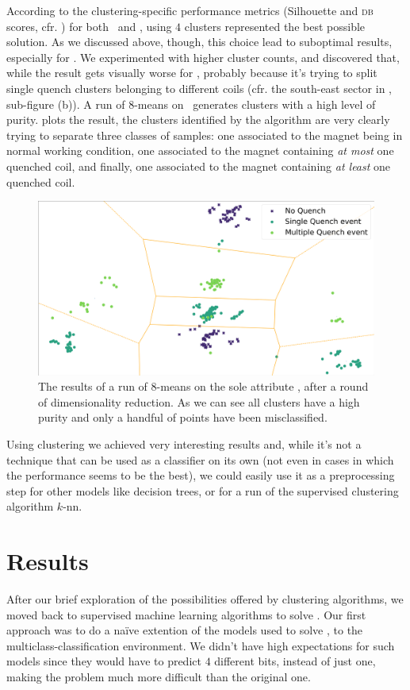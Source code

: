 According to the clustering-specific performance metrics (Silhouette and \textsc{db} scores, cfr.
) for both \an\ and \cnmod, using $4$ clusters represented the best possible solution.
As we discussed above, though, this choice lead to suboptimal results, especially for \an.  We
experimented with higher cluster counts, and discovered that, while the result gets visually worse
for \cnmod, probably because it's trying to split single quench clusters belonging to different
coils (cfr. the south-east sector in , sub-figure (b)). A run of
$8$-means on \an\ generates clusters with a high level of purity.  plots the result, the clusters identified by the algorithm are very clearly trying to separate three classes of samples: one associated to the magnet being in normal working condition, one associated to the magnet containing \emph{at most} one quenched coil, and finally, one associated to the magnet containing \emph{at least} one quenched coil.
\begin{figure}[!ht]
	\centering
	\includegraphics[width=0.8\linewidth]{img/clustering_an_qlp_8c.png}
	\caption{The results of a run of $8$-means on the sole attribute \an, after a round of \pca
		dimensionality reduction. As we can see all clusters have a high purity and only a handful of points have been misclassified.}\label{fig:clustering-an}
\end{figure}

Using clustering we achieved very interesting results and, while it's not a technique that can be
used as a classifier on its own (not even in cases in which the performance seems to be the best),
we could easily use it as a preprocessing step for other models like decision trees, or for a run of
the supervised clustering algorithm $k$-nn.

\section{Results}
After our brief exploration of the possibilities offered by clustering algorithms, we moved back to
supervised machine learning algorithms to solve \qlp. Our first approach was to do a na\"ive
extention of the models used to solve \qrp, to the multiclass-classification environment. We didn't
have high expectations for such models since they would have to predict $4$ different bits, instead of just one, making the problem
much more difficult than the original one.

